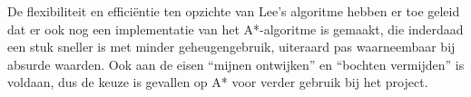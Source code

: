 \documentclass{report}
\begin{document}
\noindent
De flexibiliteit en efficiëntie ten opzichte van Lee's algoritme hebben er toe geleid dat er ook nog een implementatie van het A*-algoritme is gemaakt, die inderdaad een stuk sneller is met minder geheugengebruik, uiteraard pas waarneembaar bij absurde waarden. Ook aan de eisen ``mijnen ontwijken'' en ``bochten vermijden'' is voldaan, dus de keuze is gevallen op A* voor verder gebruik bij het project.
\end{document}
